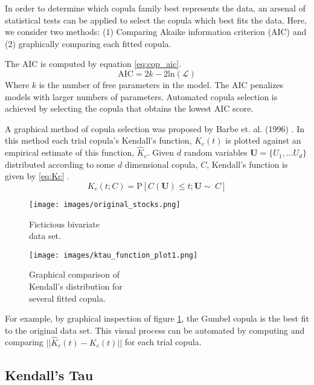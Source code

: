 In order to determine which copula family best represents the data, an arsenal of statistical tests can be applied to select the copula which best fits the data.  Here, we consider two methods:  (1) Comparing Akaike information criterion (AIC) and (2) graphically comparing each fitted copula.  

The AIC is computed by equation \ref{eq:cop_aic}.
\begin{equation}
\mathrm{AIC} = 2k - 2\mathrm{ln}(\mathcal{L})
\label{eq:cop_aic}
\end{equation}
Where $k$ is the number of free parameters in the model.  The AIC penalizes models with larger numbers of parameters. 
Automated copula selection is achieved by selecting the copula that obtains the lowest AIC score.

A graphical method of copula selection was proposed by Barbe et. al. (1996) \cite{Barbe1996}.  In this method each trial copula's Kendall's function, $K_c(t)$ is plotted against an empirical estimate of this function, $\hat K_c$.  Given $d$ random variables $\mathbf U=\{U_1, ... U_d\}$ distributed according to some $d$ dimensional copula, $C$, Kendall's function is given by \ref{eq:Kc} \cite{Joe2015}.
\begin{equation}
K_c(t; C) = \mathrm P \left[C(\mathbf U) \leq t; \mathbf{U} \sim\ C\right]
\label{eq:Kc}
\end{equation}

\begin{figure}[!htbp]
	\centering
	\begin{minipage}{.45\textwidth}
		\texttt{[image: images/original\_stocks.png]}
		\caption{Ficticious bivariate \\ data set.}
		\label{fig:biv_data_ex}
	\end{minipage}%
	\begin{minipage}{.45\textwidth}
		\texttt{[image: images/ktau\_function\_plot1.png]}
		\caption{Graphical comparison of  \\ Kendall's distribution for \\ several fitted copula.}
		\label{fig:kc_fn_compare}
	\end{minipage}
\end{figure}
For example, by graphical inspection of figure \ref{fig:kc_fn_compare}, the Gumbel copula is the best fit to the original data set.  This visual process can be automated by computing and comparing $||\hat K_c(t) - K_c(t)||$ for each trial copula.

\subsection*{Kendall's Tau}


